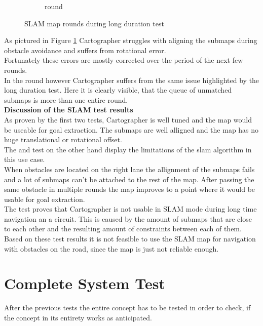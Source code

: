 \begin{figure}[H]
\begin{subfigure}{.3\linewidth}
		\caption{ round}
	\end{subfigure}

	\caption{SLAM map rounds during long duration test}
	\label{4slamtest}

\end{figure}

As pictured in Figure \ref{4slamtest} Cartographer struggles with aligning the submaps during obstacle avoidance and suffers from rotational error.\\
Fortunately these errors are mostly corrected over the period of the next few rounds.\\ In the  round however Cartographer suffers from the same issue highlighted by the long duration test. Here it is clearly visible, that the queue of unmatched submaps is more than one entire round.\\

\textbf{Discussion of the SLAM test results}\\
As proven by the first two tests, Cartographer is well tuned and the map would be useable for goal extraction. The submaps are well alligned and the map has no huge translational or rotational offset.\\

The  and  test on the other hand display the limitations of the slam algorithm in this use case.\\
When obstacles are located on the right lane the allignment of the submaps fails and a lot of submaps can't be attached to the rest of the map. After passing the same obstacle in multiple rounds the map improves to a point where it would be usable for goal extraction.\\
The  test proves that Cartographer is not usable in SLAM mode during long time navigation an a circuit. This is caused by the amount of submaps that are close to each other and the resulting amount of constraints between each of them.\\

Based on these test results it is not feasible to use the SLAM map for navigation with obstacles on the road, since the map is just not reliable enough.




\section{Complete System Test}

After the previous tests the entire concept has to be tested in order to check, if the concept in its entirety works as anticipated.

